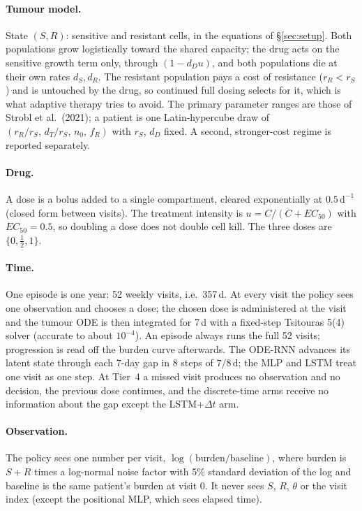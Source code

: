 \documentclass[10pt]{article}
\begin{document}
\paragraph{Tumour model.} State $(S,R)$: sensitive and resistant cells,
in the equations of \S\ref{sec:setup}. Both populations grow logistically toward the shared
capacity; the drug acts on the sensitive growth term only, through
$(1-d_D u)$, and both populations die at their own rates $d_S, d_R$. The
resistant population pays a cost of resistance ($r_R<r_S$) and is untouched by
the drug, so continued full dosing selects for it, which is what adaptive
therapy tries to avoid. The primary parameter ranges are those of Strobl et al.\
(2021); a patient is one Latin-hypercube draw of $(r_R/r_S,\,d_T/r_S,\,n_0,\,f_R)$
with $r_S$, $d_D$ fixed. A second, stronger-cost regime is reported separately.

\paragraph{Drug.} A dose is a bolus added to a single compartment, cleared
exponentially at $0.5\,\mathrm{d}^{-1}$ (closed form between visits). The
treatment intensity is $u = C/(C+EC_{50})$ with $EC_{50}=0.5$, so doubling a dose
does not double cell kill. The three doses are $\{0,\tfrac12,1\}$.

\paragraph{Time.} One episode is one year: 52 weekly visits, i.e.\ 357\,d.
At every visit the policy sees one observation and chooses a dose; the chosen
dose is administered at the visit and the tumour ODE is then integrated for
7\,d with a fixed-step Tsitouras 5(4) solver (accurate to about $10^{-4}$). An episode always runs the full 52
visits; progression is read off the burden curve afterwards. The ODE-RNN
advances its latent state through each 7-day gap in 8 steps of $7/8$\,d; the MLP
and LSTM treat one visit as one step. At Tier~4 a missed visit produces no
observation and no decision, the previous dose continues, and the
discrete-time arms receive no information about the gap except the LSTM+$\Delta t$
arm.

\paragraph{Observation.} The policy sees one number per visit,
$\log(\text{burden}/\text{baseline})$, where burden is $S+R$ times a log-normal
noise factor with 5\% standard deviation of the log and baseline is the same
patient's burden at visit 0. It never sees $S$, $R$, $\theta$ or the visit index
(except the positional MLP, which sees elapsed time).
\end{document}
